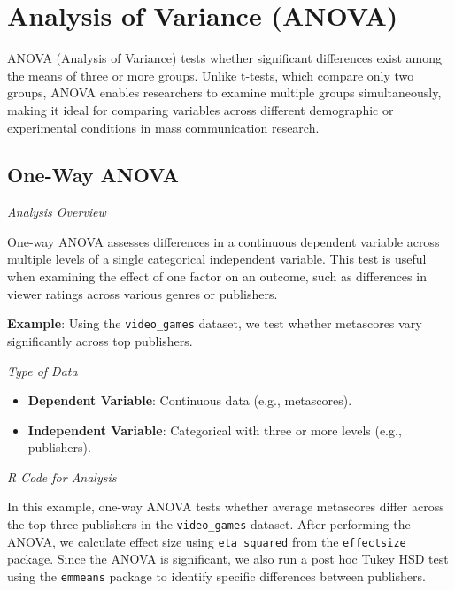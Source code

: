 \documentclass[
]{book}
\providecommand{\tightlist}{%
  \setlength{\itemsep}{0pt}\setlength{\parskip}{0pt}}
\begin{document}
\section{Analysis of Variance (ANOVA)}\label{analysis-of-variance-anova}

ANOVA (Analysis of Variance) tests whether significant differences exist among the means of three or more groups. Unlike t-tests, which compare only two groups, ANOVA enables researchers to examine multiple groups simultaneously, making it ideal for comparing variables across different demographic or experimental conditions in mass communication research.

\subsection*{One-Way ANOVA}\label{one-way-anova}

\emph{Analysis Overview}

One-way ANOVA assesses differences in a continuous dependent variable across multiple levels of a single categorical independent variable. This test is useful when examining the effect of one factor on an outcome, such as differences in viewer ratings across various genres or publishers.

\textbf{Example}: Using the \texttt{video\_games} dataset, we test whether metascores vary significantly across top publishers.

\emph{Type of Data}

\begin{itemize}
\tightlist
\item
  \textbf{Dependent Variable}: Continuous data (e.g., metascores).
\item
  \textbf{Independent Variable}: Categorical with three or more levels (e.g., publishers).
\end{itemize}

\emph{R Code for Analysis}

In this example, one-way ANOVA tests whether average metascores differ across the top three publishers in the \texttt{video\_games} dataset. After performing the ANOVA, we calculate effect size using \texttt{eta\_squared} from the \texttt{effectsize} package. Since the ANOVA is significant, we also run a post hoc Tukey HSD test using the \texttt{emmeans} package to identify specific differences between publishers.
\end{document}

